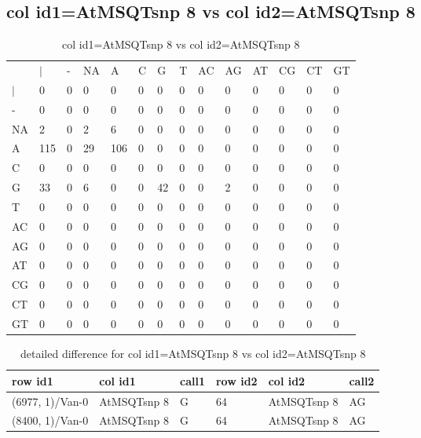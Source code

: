 \subsection{col id1=AtMSQTsnp 8 vs col id2=AtMSQTsnp 8}
\begin{center}
\begin{longtable}{|l|l|l|l|l|l|l|l|l|l|l|l|l|l|}
\caption{col id1=AtMSQTsnp 8 vs col id2=AtMSQTsnp 8} \label{table_dm968}\\
\hline
\\
\hline
&$|$&-&NA&A&C&G&T&AC&AG&AT&CG&CT&GT\\
$|$&0&0&0&0&0&0&0&0&0&0&0&0&0\\
-&0&0&0&0&0&0&0&0&0&0&0&0&0\\
NA&2&0&2&6&0&0&0&0&0&0&0&0&0\\
A&115&0&29&106&0&0&0&0&0&0&0&0&0\\
C&0&0&0&0&0&0&0&0&0&0&0&0&0\\
G&33&0&6&0&0&42&0&0&2&0&0&0&0\\
T&0&0&0&0&0&0&0&0&0&0&0&0&0\\
AC&0&0&0&0&0&0&0&0&0&0&0&0&0\\
AG&0&0&0&0&0&0&0&0&0&0&0&0&0\\
AT&0&0&0&0&0&0&0&0&0&0&0&0&0\\
CG&0&0&0&0&0&0&0&0&0&0&0&0&0\\
CT&0&0&0&0&0&0&0&0&0&0&0&0&0\\
GT&0&0&0&0&0&0&0&0&0&0&0&0&0\\
\hline
\end{longtable}
\end{center}

\begin{center}
\begin{longtable}{|l|l|l|l|l|l|}
\caption{detailed difference for col id1=AtMSQTsnp 8 vs col id2=AtMSQTsnp 8} \label{table_dm969}\\
\hline
row id1&col id1&call1&row id2&col id2&call2\\
\hline
(6977, 1)/Van-0&AtMSQTsnp 8&G&64&AtMSQTsnp 8&AG\\
(8400, 1)/Van-0&AtMSQTsnp 8&G&64&AtMSQTsnp 8&AG\\
\hline
\end{longtable}
\end{center}

